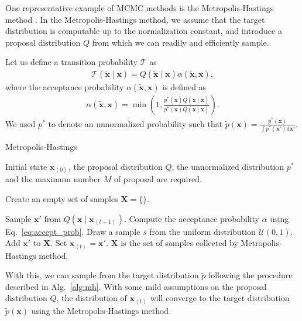 \documentclass[dissertation,nocontribution,draft*]{aaltoseries}
\newcommand{\qt}[1]{\left<#1\right>}
\newcommand{\vect}[1]{\mathbf{#1}}
\newcommand{\vx}[0]{\vect{x}}
\newcommand{\T}[0]{\mathcal{T}}
\newcommand{\dd}[1]{\text{d}{#1}}
\begin{document}
One representative example of MCMC methods is
the Metropolis-Hastings method \citep{Hastings1970}. In the
Metropolis-Hastings method, we assume that the target
distribution is computable up to the normalization constant,
and introduce a proposal distribution $Q$ from which we can
readily and efficiently sample.

Let us define a transition probability $\T$ as
\begin{align*}
    \T(\tilde{\vx} \mid \vx) = Q(\tilde{\vx}\mid \vx)
    \alpha(\tilde{\vx}, \vx),
\end{align*}
where the acceptance probability $\alpha(\tilde{\vx}, \vx)$ is
defined as
\begin{align}
    \label{eq:accept_prob}
    \alpha(\tilde{\vx}, \vx) = \min \left(1, 
    \frac{p^*(\tilde{\vx})Q(\vx \mid \tilde{\vx})}
    {p^*(\vx)Q(\tilde{\vx} \mid \vx)} \right).
\end{align}
We used $p^*$ to denote an unnormalized probability
such that
$\tilde{p}(\vx) = \tfrac{p^*(\vx)}{\int p^*(\vx') \dd{\vx'}}$.

\begin{algorithm}[tb]
    \caption[Metropolis-Hastings
    Method]{Metropolis-Hastings}
    \label{alg:mh}
    \begin{algorithmic}
        \STATE Initial state $\vx_{\qt{0}}$, the proposal
        distribution $Q$, the unnormalized distribution
        $p^*$ and the maximum number $M$ of proposal are required.

        \STATE Create an empty set of samples $\boldsymbol{X}=\{\}$.

        \STATE Sample $\vx'$ from $Q(\vx \mid
        \vx_{\qt{t-1}})$.
        \STATE Compute the acceptance probability
        $\alpha$ using Eq.~\eqref{eq:accept_prob}.
        \STATE Draw a sample $s$ from the uniform distribution
        $\mathcal{U}(0, 1)$.
        \STATE Add $\vx'$ to $\boldsymbol{X}$.
        \STATE Set $\vx_{\qt{t}} = \vx'$.
        \ENDIF
        \ENDFOR
        \STATE
        $\boldsymbol{X}$ is the set of samples collected by
        Metropolis-Hastings method.
    \end{algorithmic}
\end{algorithm}

With this, we can sample from the target
distribution $\tilde{p}$ following the procedure described
in Alg.~\ref{alg:mh}.
With some mild assumptions on the proposal distribution $Q$,
the distribution of $\vx_{\qt{t}}$ will converge to the target
distribution $\tilde{p}(\vx)$ using the Metropolis-Hastings
method.
\end{document}
